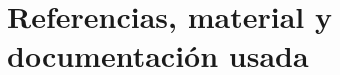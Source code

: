 \section{Referencias, material y documentación usada}


\begin{thebibliography}{9}


\end{thebibliography}
